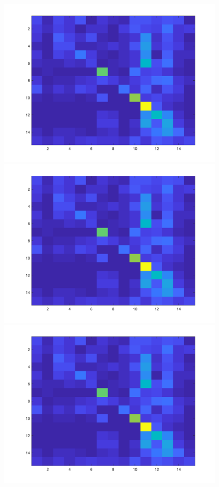 \documentclass[letter, 10pt]{article}
\begin{document}
\begin{figure}[h]
        \centering
        \includegraphics[width=\textwidth]{HW3/RESULT/ClassifyKNN_Tiny_confusion.png}
    \endminipage\hfill
        \centering
        \includegraphics[width=\textwidth]{HW3/RESULT/ClassifyKNN_Tiny_confusion.png}
    \endminipage\hfill
        \centering
        \includegraphics[width=\textwidth]{HW3/RESULT/ClassifyKNN_Tiny_confusion.png}
    \endminipage\hfill
\end{figure}
\end{document}
